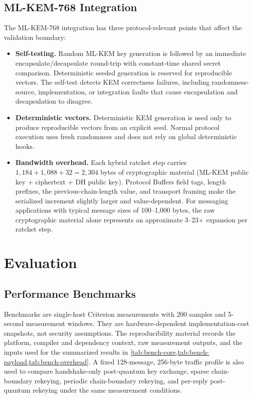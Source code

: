 \documentclass[preprint,12pt]{elsarticle}
\theoremstyle{definition}
\begin{document}
\subsection{ML-KEM-768 Integration}\label{sec:kyber-impl}

The ML-KEM-768 integration has three protocol-relevant points that affect the
validation boundary:

\begin{itemize}
  \item \textbf{Self-testing.} Random ML-KEM key generation is followed by an immediate encapsulate/decapsulate round-trip with constant-time shared secret comparison. Deterministic seeded generation is reserved for reproducible vectors. The self-test detects KEM correctness failures, including randomness-source, implementation, or integration faults that cause encapsulation and decapsulation to disagree.

  \item \textbf{Deterministic vectors.} Deterministic KEM generation is used
  only to produce reproducible vectors from an explicit seed. Normal protocol
  execution uses fresh randomness and does not rely on global deterministic
  hooks.

  \item \textbf{Bandwidth overhead.} Each hybrid ratchet step carries $1{,}184 + 1{,}088 + 32 = 2{,}304$ bytes of cryptographic material (ML-KEM public key + ciphertext + DH public key). Protocol Buffers field tags, length prefixes, the previous-chain-length value, and transport framing make the serialized increment slightly larger and value-dependent. For messaging applications with typical message sizes of 100--1{,}000 bytes, the raw cryptographic material alone represents an approximate 3--23$\times$ expansion per ratchet step.
\end{itemize}

\section{Evaluation}\label{sec:evaluation}

\subsection{Performance Benchmarks}\label{sec:benchmarks}

Benchmarks are single-host Criterion measurements with 200 samples and
5-second measurement windows. They are hardware-dependent implementation-cost
snapshots, not security assumptions. The reproducibility material records the
platform, compiler and dependency context, raw measurement outputs, and the
inputs used for the summarized results in
\cref{tab:bench-core,tab:bench-payload,tab:bench-overhead}. A fixed
128-message, 256-byte traffic profile is also used to compare handshake-only
post-quantum key exchange, sparse chain-boundary rekeying, periodic
chain-boundary rekeying, and per-reply post-quantum rekeying under the same
measurement conditions.
\end{document}
